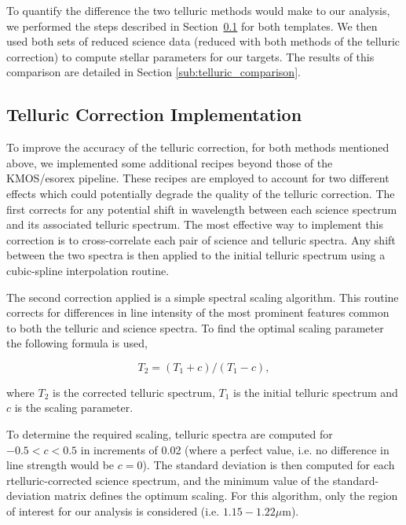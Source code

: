 \documentclass[iop]{emulateapj}
\begin{document}
To quantify the difference the two telluric methods would make to our analysis,
we performed the steps described in
Section~\ref{sub:ngc6822_telluric_correction} for both templates.
We then used both sets of reduced science data
(reduced with both methods of the telluric correction) to compute stellar parameters for our targets.
The results of this comparison are detailed in Section
\ref{sub:telluric_comparison}.


\subsection{Telluric Correction Implementation} %
\label{sub:ngc6822_telluric_correction}

To improve the accuracy of the telluric correction,
for both methods mentioned above,
we implemented some additional recipes beyond those of the KMOS/esorex pipeline.
These recipes are employed to account for two different effects which could potentially degrade the quality of the telluric correction.
The first corrects for any potential shift in wavelength between each science spectrum and its associated telluric spectrum.
The most effective way to implement this correction is to cross-correlate each pair of science and telluric spectra.
Any shift between the two spectra is then applied to the initial telluric spectrum using a cubic-spline interpolation routine.

The second correction applied is a simple spectral scaling algorithm.
This routine corrects for differences in line intensity of the most prominent features common to both the telluric and science spectra.
To find the optimal scaling parameter the following formula is used,

\begin{equation} \label{eq:shiftandres}
T_{2} = (T_{1} + c) / (T_{1} - c),
\end{equation}

\noindent where $T_{2}$ is the corrected telluric spectrum, $T_{1}$ is the initial telluric spectrum and $c$ is the scaling parameter.

To determine the required scaling,
telluric spectra are computed for $-0.5 < c < 0.5$ in increments of 0.02
(where a perfect value, i.e. no difference in line strength would be $c = 0$).
The standard deviation is then computed for each rtelluric-corrected science spectrum, and the minimum value of the standard-deviation matrix defines the optimum scaling.
For this algorithm, only the region of interest for our analysis is considered (i.e. $1.15 - 1.22\mu$m).
\end{document}
